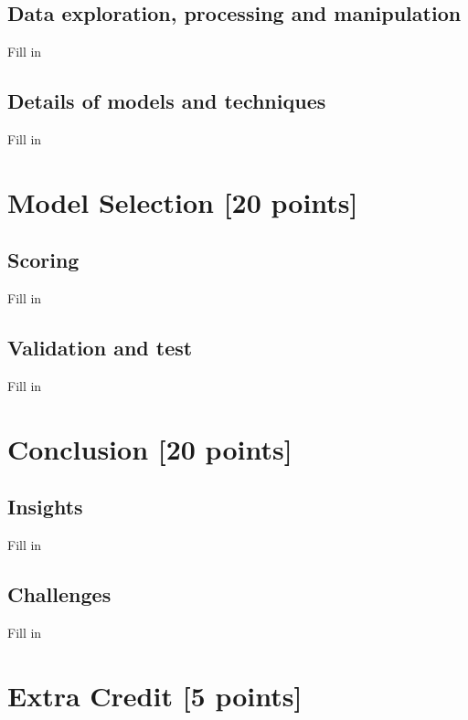 \subsection{Data exploration, processing and manipulation}
Fill in

\subsection{Details of models and techniques}
Fill in

\newpage

\section{Model Selection [20 points]}
\subsection{Scoring}
Fill in

\subsection{Validation and test}
Fill in

\newpage

\section{Conclusion [20 points]}
\subsection{Insights}
Fill in

\subsection{Challenges}
Fill in
\newpage

\section{Extra Credit [5 points]}



